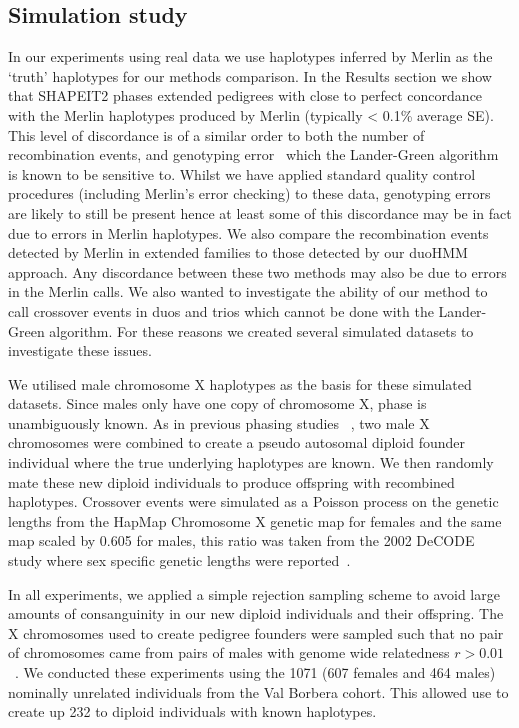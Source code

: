 \subsection{Simulation study}
 
In our experiments using real data we use haplotypes inferred by Merlin as the `truth' haplotypes for our methods comparison. In the Results section we show that SHAPEIT2 phases extended pedigrees with close to perfect concordance  with the Merlin haplotypes produced by Merlin (typically < 0.1\% average SE).  This level of discordance is of a similar order to both the number of recombination events, and genotyping error~\citep{oconnell2012} which the Lander-Green algorithm is known to be sensitive to.  Whilst we have applied standard quality control procedures (including Merlin's error checking) to these data, genotyping errors are likely to still be present hence at least some of this discordance may be in fact due to errors in Merlin haplotypes.  We also compare the recombination events detected by Merlin in extended families to those detected by our duoHMM approach. Any discordance between these two methods may also be due to errors in the Merlin calls.  We also wanted to investigate the ability of our method to call crossover events in duos and trios which cannot be done with the Lander-Green algorithm. For these reasons we created several simulated datasets to investigate these issues.

We utilised male chromosome X haplotypes as the basis for these simulated datasets. Since males only have one copy of chromosome X, phase is unambiguously known. As in previous phasing studies ~\citep{Lin:2002hh, browning2007, delaneau2013}, two male X chromosomes were combined to create a pseudo autosomal diploid founder individual where the true underlying haplotypes are known. We then randomly mate these new diploid individuals to produce offspring with recombined haplotypes. Crossover events were simulated as a Poisson process on the genetic lengths from the HapMap Chromosome X genetic map for females and the same map scaled by 0.605 for males, this ratio was taken from the 2002 DeCODE study where sex specific genetic lengths were reported~\cite{kong2002}.

In all experiments, we applied a simple rejection sampling scheme to avoid large amounts of consanguinity in our new diploid individuals and their offspring. The X chromosomes used to create pedigree founders were sampled such that no pair of chromosomes came from pairs of males with genome wide relatedness $r > 0.01$~\citep{hayes2009increased}. We conducted these experiments using the 1071 (607 females and 464 males) nominally unrelated individuals from the Val Borbera cohort.  This allowed use to create up 232 to diploid individuals with known haplotypes.

